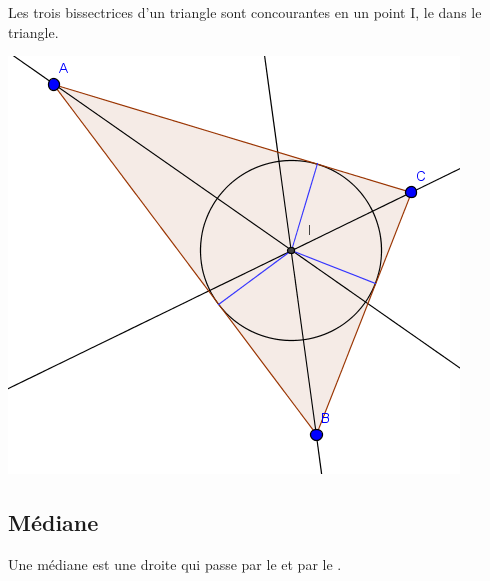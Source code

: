 \documentclass[12pt,a4paper]{article}
\begin{document}
\begin{myprop}
	
	\begin{multicols}{2}
	
		Les trois bissectrices d'un triangle sont concourantes en un point I, le  dans le triangle. 

		\begin{center}
			\includegraphics[scale=0.45]{./img/bissectrices}
		\end{center} 
	\end{multicols}
\end{myprop}

\subsection{Médiane}

\begin{mydef}	
	Une médiane est une droite qui passe par le  et par le .
\end{mydef}
\end{document}
